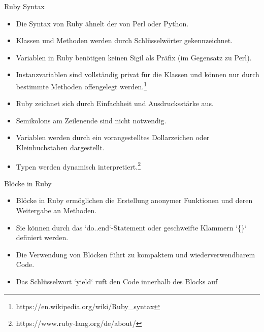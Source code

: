 \documentclass{beamer}
\begin{document}
\begin{frame}{Ruby Syntax}
  \begin{itemize}
    \item Die Syntax von Ruby ähnelt der von Perl oder Python.
    \item Klassen und Methoden werden durch Schlüsselwörter gekennzeichnet.
    \item Variablen in Ruby benötigen keinen Sigil als Präfix (im Gegensatz zu Perl).
    \item Instanzvariablen sind vollständig privat für die Klassen und können nur durch bestimmte Methoden offengelegt werden.\footnote{https://en.wikipedia.org/wiki/Ruby\_syntax}
    \item Ruby zeichnet sich durch Einfachheit und Ausdrucksstärke aus.
    \item Semikolons am Zeilenende sind nicht notwendig.
    \item Variablen werden durch ein vorangestelltes Dollarzeichen oder Kleinbuchstaben dargestellt.
    \item Typen werden dynamisch interpretiert.\footnote{https://www.ruby-lang.org/de/about/}
  \end{itemize}
\end{frame}
\begin{frame}{Blöcke in Ruby}
  \begin{itemize}
    \item Blöcke in Ruby ermöglichen die Erstellung anonymer Funktionen und deren Weitergabe an Methoden.
    \item Sie können durch das `do..end`-Statement oder geschweifte Klammern `\{\}` definiert werden.

    \item Die Verwendung von Blöcken führt zu kompaktem und wiederverwendbarem Code.
    \item Das Schlüsselwort `yield` ruft den Code innerhalb des Blocks auf

  \end{itemize}

\end{frame}
\end{document}
